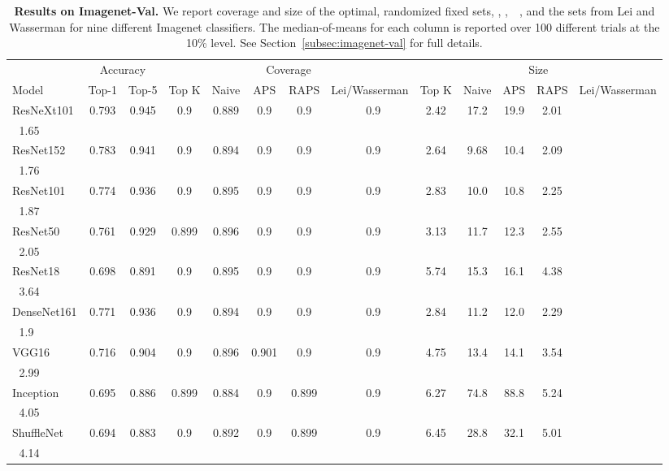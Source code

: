 \begin{table}[t] 
\centering 
\small 
\begin{tabular}{lcccccccccccc} 
\toprule 
 & \multicolumn{2}{c}{Accuracy}  & \multicolumn{5}{c}{Coverage} & \multicolumn{5}{c}{Size} \\ 
\cmidrule(r){2-3}  \cmidrule(r){4-8}  \cmidrule(r){9-13} 
Model & Top-1 & Top-5 & Top K & Naive & APS & RAPS & Lei/Wasserman & Top K & Naive & APS & RAPS & Lei/Wasserman \\ 
\midrule 
 ResNeXt101 &  0.793 &  0.945 & 0.9 & 0.889 & 0.9 & 0.9 &  0.9 & 2.42 & 17.2 & 19.9 & 2.01 \\ 
 1.65 \\ 
 ResNet152 &  0.783 &  0.941 & 0.9 & 0.894 & 0.9 & 0.9 &  0.9 & 2.64 & 9.68 & 10.4 & 2.09 \\ 
 1.76 \\ 
 ResNet101 &  0.774 &  0.936 & 0.9 & 0.895 & 0.9 & 0.9 &  0.9 & 2.83 & 10.0 & 10.8 & 2.25 \\ 
 1.87 \\ 
 ResNet50 &  0.761 &  0.929 & 0.899 & 0.896 & 0.9 & 0.9 &  0.9 & 3.13 & 11.7 & 12.3 & 2.55 \\ 
 2.05 \\ 
 ResNet18 &  0.698 &  0.891 & 0.9 & 0.895 & 0.9 & 0.9 &  0.9 & 5.74 & 15.3 & 16.1 & 4.38 \\ 
 3.64 \\ 
 DenseNet161 &  0.771 &  0.936 & 0.9 & 0.894 & 0.9 & 0.9 &  0.9 & 2.84 & 11.2 & 12.0 & 2.29 \\ 
 1.9 \\ 
 VGG16 &  0.716 &  0.904 & 0.9 & 0.896 & 0.901 & 0.9 &  0.9 & 4.75 & 13.4 & 14.1 & 3.54 \\ 
 2.99 \\ 
 Inception &  0.695 &  0.886 & 0.899 & 0.884 & 0.9 & 0.899 &  0.9 & 6.27 & 74.8 & 88.8 & 5.24 \\ 
 4.05 \\ 
 ShuffleNet &  0.694 &  0.883 & 0.9 & 0.892 & 0.9 & 0.899 &  0.9 & 6.45 & 28.8 & 32.1 & 5.01 \\ 
 4.14 \\ 
\bottomrule 
\end{tabular} 
\caption{\textbf{Results on Imagenet-Val.} We report coverage and size of the optimal, randomized fixed sets, \naive, \aps,\ \raps\ , and the sets from Lei and Wasserman for nine different Imagenet classifiers. The median-of-means for each column is reported over 100 different trials at the 10\% level. See Section~\ref{subsec:imagenet-val} for full details.} 
\label{table:imagenet-val-lei-wasserman} 
\end{table} 
